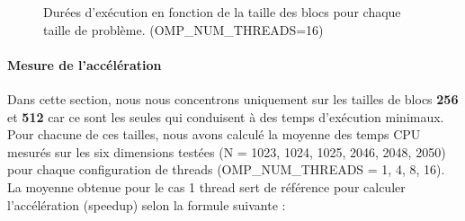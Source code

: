 \documentclass[a4paper,13pt]{book}
\begin{document}
    \begin{figure}[ht]
        \centering
        \caption{Durées d'exécution en fonction de la taille des blocs pour chaque taille de problème. (OMP\_NUM\_THREADS=16)}
        \label{fig:execution_time_16}
    \end{figure}
\clearpage
\paragraph{Mesure de l'accélération}
Dans cette section, nous nous concentrons uniquement sur les tailles de blocs \textbf{256} et \textbf{512} car ce sont les seules qui conduisent à des temps d'exécution minimaux. Pour chacune de ces tailles, nous avons calculé la moyenne des temps CPU mesurés sur les six dimensions testées (N = 1023, 1024, 1025, 2046, 2048, 2050) pour chaque configuration de threads (OMP\_NUM\_THREADS = 1, 4, 8, 16). La moyenne obtenue pour le cas 1 thread sert de référence pour calculer l'accélération (speedup) selon la formule suivante :
\end{document}
